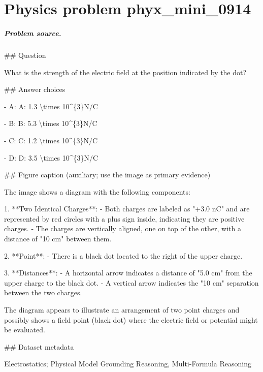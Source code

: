 
\chapter{Physics problem phyx\_mini\_0914}
\label{ch:PhyXMiniProblems_problem_phyx_mini_0914}

\paragraph{Problem source.}
\#\# Question

What is the strength of the electric field at the position indicated by the dot?

\#\# Answer choices

- A: A: 1.3 \textbackslash{}times 10\textasciicircum{}\{3\}N/C

- B: B: 5.3 \textbackslash{}times 10\textasciicircum{}\{3\}N/C

- C: C: 1.2 \textbackslash{}times 10\textasciicircum{}\{3\}N/C

- D: D: 3.5 \textbackslash{}times 10\textasciicircum{}\{3\}N/C

\#\# Figure caption (auxiliary; use the image as primary evidence)

The image shows a diagram with the following components:

1. **Two Identical Charges**: 
   - Both charges are labeled as "+3.0 nC" and are represented by red circles with a plus sign inside, indicating they are positive charges.
   - The charges are vertically aligned, one on top of the other, with a distance of "10 cm" between them.

2. **Point**:
   - There is a black dot located to the right of the upper charge.

3. **Distances**:
   - A horizontal arrow indicates a distance of "5.0 cm" from the upper charge to the black dot.
   - A vertical arrow indicates the "10 cm" separation between the two charges.

The diagram appears to illustrate an arrangement of two point charges and possibly shows a field point (black dot) where the electric field or potential might be evaluated.

\#\# Dataset metadata

Electrostatics; Physical Model Grounding Reasoning, Multi-Formula Reasoning

